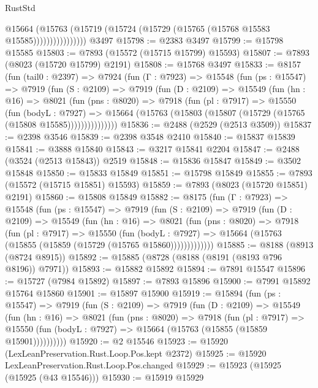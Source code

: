 \begin{lexlean}{RustStd}
\begin{coremodule}
                      @15664
                        (@15763
                          (@15719 (@15724 (@15729 (@15765 (@15768 @15583 @15585))))))))))))))))
    @3497
@15798 := @2383 @3497
@15799 := @15798 @15585
@15803 := @7893 (@15572 (@15715 @15799) @15593)
@15807 := @7893 (@8023 (@15720 @15799) @2191)
@15808 := @15768 @3497
@15833 := @8157
    (fun (tail0 : @2397) =>
    @7924
      (fun (Γ : @7923) =>
      @15548
        (fun (ps : @15547) =>
        @7919
          (fun (S : @2109) =>
          @7919
            (fun (D : @2109) =>
            @15549
              (fun (hn : @16) =>
              @8021
                (fun (pns : @8020) =>
                @7918
                  (fun (pl : @7917) =>
                  @15550
                    (fun (bodyL : @7927) =>
                    @15664 (@15763 (@15803 (@15807 (@15729 (@15765 (@15808 @15585)))))))))))))))
@15836 := @2488 (@2529 (@2513 @3509))
@15837 := @2398 @3546
@15839 := @2398 @3548 @2410
@15840 := @15837 @15839
@15841 := @3888 @15840
@15843 := @3217 @15841 @2204
@15847 := @2488 (@3524 (@2513 @15843)) @2519
@15848 := @15836 @15847
@15849 := @3502 @15848
@15850 := @15833 @15849
@15851 := @15798 @15849
@15855 := @7893 (@15572 (@15715 @15851) @15593)
@15859 := @7893 (@8023 (@15720 @15851) @2191)
@15860 := @15808 @15849
@15882 := @8175
    (fun (Γ : @7923) =>
    @15548
      (fun (ps : @15547) =>
      @7919
        (fun (S : @2109) =>
        @7919
          (fun (D : @2109) =>
          @15549
            (fun (hn : @16) =>
            @8021
              (fun (pns : @8020) =>
              @7918
                (fun (pl : @7917) =>
                @15550
                  (fun (bodyL : @7927) =>
                  @15664 (@15763 (@15855 (@15859 (@15729 (@15765 @15860)))))))))))))
@15885 := @8188 (@8913 (@8724 @8915))
@15892 := @15885 (@8728 (@8188 (@8191 (@8193 @796 @8196)) @7971))
@15893 := @15882 @15892
@15894 := @7891 @15547
@15896 := @15727 (@7984 @15892)
@15897 := @7893 @15896
@15900 := @7991 @15892 @15764 @15860
@15901 := @15897 @15900
@15919 := @15894
    (fun (ps : @15547) =>
    @7919
      (fun (S : @2109) =>
      @7919
        (fun (D : @2109) =>
        @15549
          (fun (hn : @16) =>
          @8021
            (fun (pns : @8020) =>
            @7918
              (fun (pl : @7917) =>
              @15550 (fun (bodyL : @7927) => @15664 (@15763 (@15855 (@15859 @15901))))))))))
@15920 := @2 @15546
@15923 := @15920 (LexLeanPreservation.Rust.Loop.Pos.kept @2372)
@15925 := @15920 LexLeanPreservation.Rust.Loop.Pos.changed
@15929 := @15923 (@15925 (@15925 (@43 @15546)))
@15930 := @15919 @15929

\end{coremodule}
\end{lexlean}
